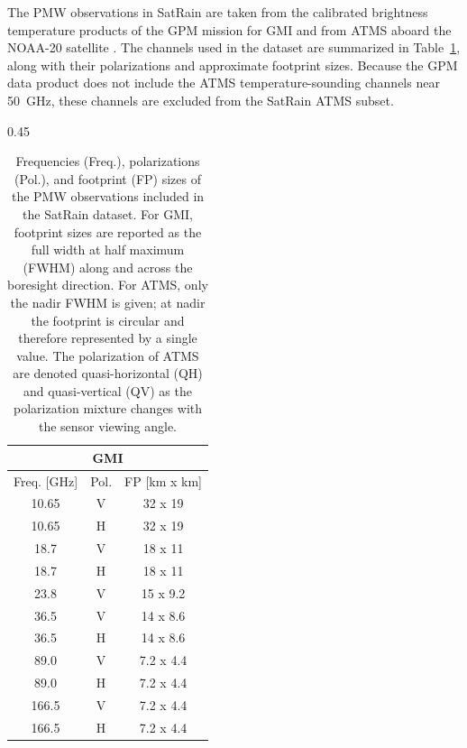 \documentclass[11pt]{article}
\begin{document}
The PMW observations in SatRain are taken from the calibrated brightness
temperature products of the GPM mission for GMI \citep{Berg2022_GMI_L1C_R_V07}
and from ATMS aboard the NOAA-20 satellite \citep{Berg2022_ATMS_NOAA20_1C_V07}.
The channels used in the dataset are summarized in Table~\ref{tab:pmw_channels},
along with their polarizations and approximate footprint sizes. Because the GPM
data product does not include the ATMS temperature-sounding channels near
\SI{50}{\giga\hertz}, these channels are excluded from the SatRain ATMS
subset.

\begin{table}[htbp]
	\centering
	\caption{
		Frequencies (Freq.), polarizations (Pol.), and footprint (FP) sizes of the
		PMW observations included in the SatRain dataset. For GMI, footprint sizes are
		reported as the full width at half maximum (FWHM) along and across the
		boresight direction. For ATMS, only the nadir FWHM is given; at nadir the
		footprint is circular and therefore represented by a single value. The
		polarization of ATMS are denoted quasi-horizontal (QH) and quasi-vertical (QV)
		as the polarization mixture changes with the sensor viewing angle.
	}
	\label{tab:pmw_channels}
	\begin{subtable}{0.45\textwidth}
		\centering
		\begin{tabular}{ccc}
			\multicolumn{3}{c}{GMI}           \\[0.5ex]
			\toprule
			Freq. [GHz] & Pol. & FP [km x km] \\
			\midrule
			10.65       & V    & 32 x 19      \\
			10.65       & H    & 32 x 19      \\
			18.7        & V    & 18 x 11      \\
			18.7        & H    & 18 x 11      \\
			23.8        & V    & 15 x 9.2     \\
			36.5        & V    & 14 x 8.6     \\
			36.5        & H    & 14 x 8.6     \\
			89.0        & V    & 7.2 x 4.4    \\
			89.0        & H    & 7.2 x 4.4    \\
			166.5       & V    & 7.2 x 4.4    \\
			166.5       & H    & 7.2 x 4.4    \\
			\bottomrule
		\end{tabular}
	\end{subtable}%
	\hfill%

\end{table}
\end{document}
